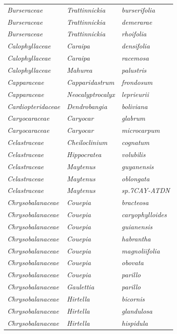 \documentclass[fleqn,10pt]{ArtEcoFoG} %
\begin{document}
\begin{table}[t]
\begin{tabular}{lll}
\addlinespace
\em{Burseraceae} & \em{Trattinnickia} & \em{burserifolia}\\
\em{Burseraceae} & \em{Trattinnickia} & \em{demerarae}\\
\em{Burseraceae} & \em{Trattinnickia} & \em{rhoifolia}\\
\em{Calophyllaceae} & \em{Caraipa} & \em{densifolia}\\
\em{Calophyllaceae} & \em{Caraipa} & \em{racemosa}\\
\addlinespace
\em{Calophyllaceae} & \em{Mahurea} & \em{palustris}\\
\em{Capparaceae} & \em{Capparidastrum} & \em{frondosum}\\
\em{Capparaceae} & \em{Neocalyptrocalyx} & \em{leprieurii}\\
\em{Cardiopteridaceae} & \em{Dendrobangia} & \em{boliviana}\\
\em{Caryocaraceae} & \em{Caryocar} & \em{glabrum}\\
\addlinespace
\em{Caryocaraceae} & \em{Caryocar} & \em{microcarpum}\\
\em{Celastraceae} & \em{Cheiloclinium} & \em{cognatum}\\
\em{Celastraceae} & \em{Hippocratea} & \em{volubilis}\\
\em{Celastraceae} & \em{Maytenus} & \em{guyanensis}\\
\em{Celastraceae} & \em{Maytenus} & \em{oblongata}\\
\addlinespace
\em{Celastraceae} & \em{Maytenus} & \em{sp.7CAY-ATDN}\\
\em{Chrysobalanaceae} & \em{Couepia} & \em{bracteosa}\\
\em{Chrysobalanaceae} & \em{Couepia} & \em{caryophylloides}\\
\em{Chrysobalanaceae} & \em{Couepia} & \em{guianensis}\\
\em{Chrysobalanaceae} & \em{Couepia} & \em{habrantha}\\
\addlinespace
\em{Chrysobalanaceae} & \em{Couepia} & \em{magnoliifolia}\\
\em{Chrysobalanaceae} & \em{Couepia} & \em{obovata}\\
\em{Chrysobalanaceae} & \em{Couepia} & \em{parillo}\\
\em{Chrysobalanaceae} & \em{Gaulettia} & \em{parillo}\\
\em{Chrysobalanaceae} & \em{Hirtella} & \em{bicornis}\\
\addlinespace
\em{Chrysobalanaceae} & \em{Hirtella} & \em{glandulosa}\\
\em{Chrysobalanaceae} & \em{Hirtella} & \em{hispidula}\\

\end{tabular}
\end{table}
\end{document}
